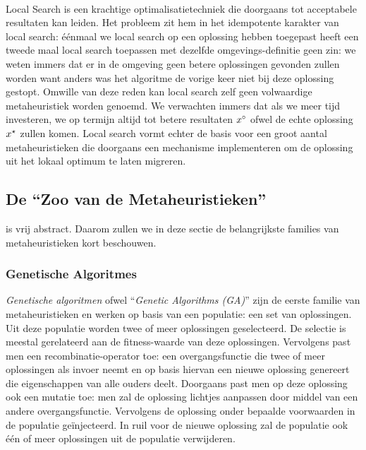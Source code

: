 \paragraph{}
Local Search is een krachtige optimalisatietechniek die doorgaans tot acceptabele resultaten kan leiden. Het probleem zit hem in het idempotente karakter van local search: \'e\'enmaal we local search op een oplossing hebben toegepast heeft een tweede maal local search toepassen met dezelfde omgevings-definitie geen zin: we weten immers dat er in de omgeving geen betere oplossingen gevonden zullen worden want anders was het algoritme de vorige keer niet bij deze oplossing gestopt. Omwille van deze reden kan local search zelf geen volwaardige metaheuristiek worden genoemd\cite{lsAndMh}. We verwachten immers dat als we meer tijd investeren, we op termijn altijd tot betere resultaten $x^{\circ}$ ofwel de echte oplossing $x^{\star}$ zullen komen. Local search vormt echter de basis voor een groot aantal metaheuristieken die doorgaans een mechanisme implementeren om de oplossing uit het lokaal optimum te laten migreren.

\subsection{De ``Zoo van de Metaheuristieken''}

 is vrij abstract. Daarom zullen we in deze sectie de belangrijkste families van metaheuristieken kort beschouwen.

\subsubsection{Genetische Algoritmes}

\emph{Genetische algoritmen} ofwel ``\emph{Genetic Algorithms (GA)}'' zijn de eerste familie van metaheuristieken en werken op basis van een populatie: een set van oplossingen. Uit deze populatie worden twee of meer oplossingen geselecteerd. De selectie is meestal gerelateerd aan de fitness-waarde van deze oplossingen. Vervolgens past men een recombinatie-operator toe: een overgangsfunctie die twee of meer oplossingen als invoer neemt en op basis hiervan een nieuwe oplossing genereert die eigenschappen van alle ouders deelt. Doorgaans past men op deze oplossing ook een mutatie toe: men zal de oplossing lichtjes aanpassen door middel van een andere overgangsfunctie. Vervolgens de oplossing onder bepaalde voorwaarden in de populatie ge\"injecteerd. In ruil voor de nieuwe oplossing zal de populatie ook \'e\'en of meer oplossingen uit de populatie verwijderen.

